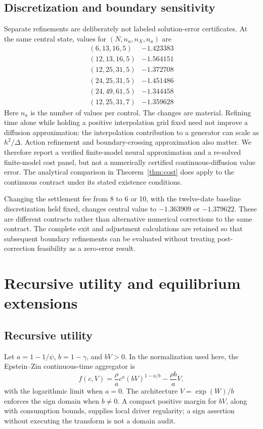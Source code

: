 \subsection{Discretization and boundary sensitivity}
Separate refinements are deliberately not labeled solution-error certificates. At the same central state, values for $(N,n_u,n_X,n_a)$ are
\[
\begin{array}{c|r}
(6,13,16,5)&-1.423383\\
(12,13,16,5)&-1.564151\\
(12,25,31,5)&-1.372708\\
(24,25,31,5)&-1.451486\\
(24,49,61,5)&-1.344458\\
(12,25,31,7)&-1.359628
\end{array}
\]
Here $n_a$ is the number of values per control. The changes are material. Refining time alone while holding a positive interpolation grid fixed need not improve a diffusion approximation: the interpolation contribution to a generator can scale as $h^2/\Delta$. Action refinement and boundary-crossing approximation also matter. We therefore report a verified finite-model neural approximation and a re-solved finite-model cost panel, but not a numerically certified continuous-diffusion value error. The analytical comparison in Theorem~\ref{thm:cost} does apply to the continuous contract under its stated existence conditions.

Changing the settlement fee from 8 to 6 or 10, with the twelve-date baseline discretization held fixed, changes central value to $-1.363909$ or $-1.379622$. These are different contracts rather than alternative numerical corrections to the same contract. The complete exit and adjustment calculations are retained so that subsequent boundary refinements can be evaluated without treating post-correction feasibility as a zero-error result.

\section{Recursive utility and equilibrium extensions}
\label{sec:extensions}
\subsection{Recursive utility}\label{sec:recursive}
Let $a=1-1/\psi$, $b=1-\gamma$, and $bV>0$. In the normalization used here, the Epstein--Zin continuous-time aggregator is
\begin{equation}
f(c,V)=\frac{\rho}{a}c^a(bV)^{1-a/b}-\frac{\rho b}{a}V,
\label{eq:ez}
\end{equation}
with the logarithmic limit when $a=0$. The architecture $V=\exp(W)/b$ enforces the sign domain when $b\ne0$. A compact positive margin for $bV$, along with consumption bounds, supplies local driver regularity; a sign assertion without executing the transform is not a domain audit.


